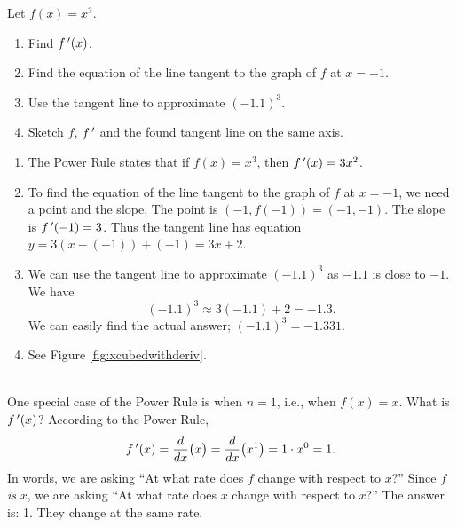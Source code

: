 {Let $f(x)=x^3$. 

		\begin{enumerate}
		\item		Find $f\,'(x)$.
		\item		Find the equation of the line tangent to the graph of $f$ at $x=-1$. 
		\item		Use the tangent line to approximate $(-1.1)^3$.
		\item		Sketch $f$, $f\,'$ and the found tangent line on the same axis.
		\end{enumerate}
}
{	\begin{enumerate}
\enlargethispage{\baselineskip}
		\item		The Power Rule states that if $f(x) = x^3$, then $f\,'(x) = 3x^2$. 

		\item		To find the equation of the line tangent to the graph of $f$ at $x=-1$, we need a point and the slope. The point is $(-1,f(-1)) = (-1, -1)$. The slope is $f\,'(-1)= 3$. Thus the tangent line has equation $y = 3(x-(-1))+(-1) = 3x+2$. 
		
		\item		We can use the tangent line to approximate $(-1.1)^3$ as $-1.1$ is close to $-1$. We have $$(-1.1)^3 \approx 3(-1.1)+2 = -1.3.$$
			We can easily find the actual answer; $(-1.1)^3 = -1.331$. 
		
		\item		See Figure \ref{fig:xcubedwithderiv}.
		\end{enumerate}
\baselineskip
}\\

One special case of the Power Rule is when $n=1$, i.e., when $f(x) = x$. What is $f\,'(x)$? According to the Power Rule, $$f\,'(x) = \frac{d}{dx}\big(x\big) = \frac{d}{dx}\big(x^1\big) = 1\cdot x^0 = 1.$$ In words, we are asking ``At what rate does $f$ change with respect to $x$?'' Since $f$ \textit{is} $x$, we are asking ``At what rate does $x$ change with respect to $x$?'' The answer is: 1. They change at the same rate.

